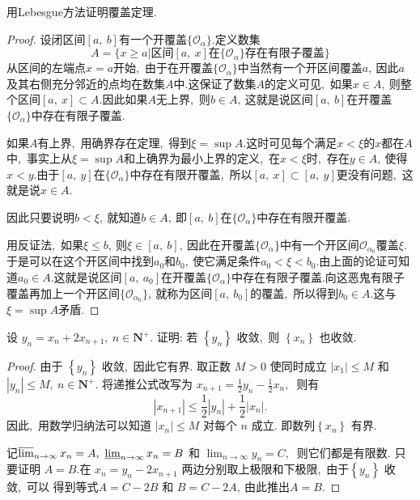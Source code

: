 \newpage
\begin{example}
	用Lebesgue方法证明覆盖定理.
\end{example}
\begin{proof}
	设闭区间$[a,\ b]$有一个开覆盖$\{\mathcal{O}_\alpha\}.$定义数集
	$$A=\{x\geqslant a|\text{区间}[a,\ x]\text{在}\{\mathcal{O}_\alpha\}\text{存在有限子覆盖} \}$$
	从区间的左端点$x=a$开始,\ 由于在开覆盖$\{\mathcal{O}_\alpha\}$中当然有一个开区间覆盖$a,\ $因此$a$及其右侧充分邻近的点均在数集$A$中.这保证了数集$A$的定义可见,\ 如果$x\in A,\ $则整个区间$[a,\ x]\subset A.$因此如果$A$无上界,\ 则$b\in A,\ $这就是说区间$[a,\ b]$在开覆盖$\{\mathcal{O}_\alpha\}$中存在有限子覆盖.
	
	如果$A$有上界,\ 用确界存在定理,\ 得到$\xi=\sup A.$这时可见每个满足$x<\xi$的$x$都在$A$中,\ 事实上从$\xi=\sup A$和上确界为最小上界的定义,\ 在$x<\xi$时,\ 存在$y\in A,\ $使得$x<y.$由于$[a,\ y]$在$\{\mathcal{O}_\alpha\}$中存在有限开覆盖,\ 所以$[a,\ x]\subset[a,\ y]$更没有问题,\ 这就是说$x\in A.$
	
	因此只要说明$b<\xi,\ $就知道$b\in A,\ $即$[a,\ b]$在$\{\mathcal{O}_\alpha\}$中存在有限开覆盖.
	
	用反证法,\ 如果$\xi\leqslant b,\ $则$\xi\in[a,\ b],\ $因此在开覆盖$\{\mathcal{O}_\alpha\}$中有一个开区间$\mathcal{O}_{\alpha_0}$覆盖$\xi.$于是可以在这个开区间中找到$a_0$和$b_0,\ $使它满足条件$a_0<\xi<b_0.$由上面的论证可知道$a_0\in A.$这就是说区间$[a,\ a_0]$在开覆盖$\{\mathcal{O}_\alpha\}$中存在有限子覆盖.向这恶鬼有限子覆盖再加上一个开区间$\{\mathcal{O}_{\alpha_0}\},\ $就称为区间$[a,\ b_0]$的覆盖,\ 所以得到$b_0\in A.$这与$\xi=\sup A$矛盾.
\end{proof}
\newpage
\begin{example}
	设  $y_{n}=x_{n}+2 x_{n+1},\  n \in \mathbf{N}^{+} .$ 证明: 若  $\left\{y_{n}\right\} $ 收敛,\  则  $\left\{x_{n}\right\} $ 也收敛.
\end{example}
\begin{proof}
	由于  $\left\{y_{n}\right\} $ 收敛,\  因此它有界. 取正数 $ M>0 $ 使同时成立  $\left|x_{1}\right| \leqslant M $ 和$  \left|y_{n}\right| \leqslant M,\  n \in \mathbf{N}^{+} .$ 将递推公式改写为  $x_{n+1}=\frac{1}{2} y_{n}-\frac{1}{2} x_{n} ,\ $ 则有
	$$\left|x_{n+1}\right| \leqslant \frac{1}{2}\left|y_{n}\right|+\frac{1}{2}\left|x_{n}\right|.$$
	因此,\  用数学归纳法可以知道  $\left|x_{n}\right| \leqslant M $ 对每个  $n$  成立. 即数列$  \left\{x_{n}\right\} $ 有界.
	
	记$  \varlimsup_{n \rightarrow \infty} x_{n}=A,\  \varliminf_{n \rightarrow \infty} x_{n}=B$  和 $ \lim _{n \rightarrow \infty} y_{n}=C ,\ $ 则它们都是有限数. 只要证明 $ A=B . $在  $x_{n}=y_{n}-2 x_{n+1}$  两边分别取上极限和下极限,\  由于$  \left\{y_{n}\right\} $ 收敛,\  可以 得到等式$ A=C-2 B$  和  $B=C-2 A ,\  $由此推出$  A=B .$
\end{proof}
